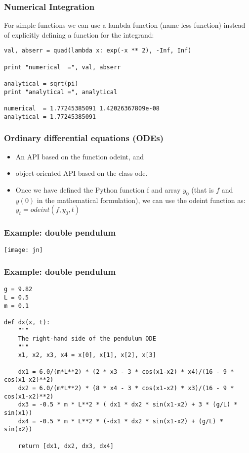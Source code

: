 \begin{frame}[fragile]\frametitle{Numerical Integration}
For simple functions we can use a lambda function (name-less function) instead of explicitly defining a function for the integrand:
\begin{lstlisting}
val, abserr = quad(lambda x: exp(-x ** 2), -Inf, Inf)

print "numerical  =", val, abserr

analytical = sqrt(pi)
print "analytical =", analytical

numerical  = 1.77245385091 1.42026367809e-08
analytical = 1.77245385091
\end{lstlisting}

\end{frame}


\begin{frame}[fragile]\frametitle{Ordinary differential equations (ODEs)}
 \begin{itemize}
  \item  An API based on the function odeint, and 
  \item object-oriented API based on the class ode.
  \item Once we have defined the Python function f and array $y_0$ (that is $f$ and $y(0)$ in the mathematical formulation), we can use the odeint function as:
$y_t = odeint(f, y_0, t)$
 \end{itemize}  
\end{frame}

\begin{frame}[fragile]\frametitle{Example: double pendulum}
\begin{center}
\texttt{[image: jn]}
\end{center}
\end{frame}

\begin{frame}[fragile]\frametitle{Example: double pendulum}
\begin{lstlisting}
g = 9.82
L = 0.5
m = 0.1

def dx(x, t):
    """
    The right-hand side of the pendulum ODE
    """
    x1, x2, x3, x4 = x[0], x[1], x[2], x[3]
    
    dx1 = 6.0/(m*L**2) * (2 * x3 - 3 * cos(x1-x2) * x4)/(16 - 9 * cos(x1-x2)**2)
    dx2 = 6.0/(m*L**2) * (8 * x4 - 3 * cos(x1-x2) * x3)/(16 - 9 * cos(x1-x2)**2)
    dx3 = -0.5 * m * L**2 * ( dx1 * dx2 * sin(x1-x2) + 3 * (g/L) * sin(x1))
    dx4 = -0.5 * m * L**2 * (-dx1 * dx2 * sin(x1-x2) + (g/L) * sin(x2))
    
    return [dx1, dx2, dx3, dx4]
\end{lstlisting}
\end{frame}

